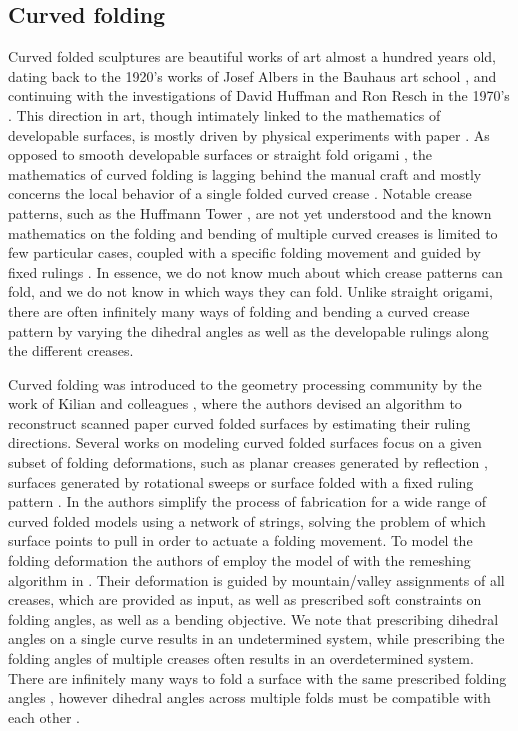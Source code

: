 \subsection{Curved folding}
Curved folded sculptures are beautiful works of art almost a hundred years old, dating back to the 1920's works of Josef Albers in the Bauhaus art school \cite{josef_albers_thesis}, and continuing with the investigations of David Huffman and Ron Resch in the 1970's \cite{huffman,resch1974portfolio}. This direction in art, though intimately linked to the mathematics of developable surfaces, is mostly driven by physical experiments with paper \cite{curved_review}. As opposed to smooth developable surfaces \cite{do_carmo} or straight fold origami \cite{origami_book}, the mathematics of curved folding is lagging behind the manual craft and mostly concerns the local behavior of a single folded curved crease \cite{duncan_folded,mathematical_omnibus,curved_review}. Notable crease patterns, such as the Huffmann Tower \cite{huffman2,huffmann_reconstructing}, are not yet understood \cite{demaine2018conic} and the known mathematics on the folding and bending of multiple curved creases is limited to few particular cases, coupled with a specific folding movement and guided by fixed rulings \cite{demaine_lens, demaine2018conic}. In essence, we do not know much about which crease patterns can fold, and we do not know in which ways they can fold. Unlike straight origami, there are often infinitely many ways of folding and bending a curved crease pattern by varying the dihedral angles as well as the developable rulings along the different creases. 

Curved folding was introduced to the geometry processing community by the work of Kilian and colleagues , where the authors devised an algorithm to reconstruct scanned paper curved folded surfaces by estimating their ruling directions. Several works on modeling curved folded surfaces focus on a given subset of folding deformations, such as planar creases generated by reflection \cite{mitani2012column,Mitani_ref}, surfaces generated by rotational sweeps \cite{mitani2009design} or surface folded with a fixed ruling pattern \cite{pottmann_new}. In \cite{StringActuated:2017} the authors simplify the process of fabrication for a wide range of curved folded models using a network of strings, solving the problem of which surface points to pull in order to actuate a folding movement. To model the folding deformation the authors of \cite{StringActuated:2017} employ the model of \cite{botsch2006primo} with the remeshing algorithm in \cite{narain2012adaptive}. Their deformation is guided by mountain/valley assignments of all creases, which are provided as input, as well as prescribed soft constraints on folding angles, as well as a bending objective. We note that prescribing dihedral angles on a single curve results in an undetermined system, while prescribing the folding angles of multiple creases often results in an overdetermined system. There are infinitely many ways to fold a surface with the same prescribed folding angles \cite{more_on_paper,duncan_folded}, however dihedral angles across multiple folds must be compatible with each other \cite{demaine2018conic}. 

